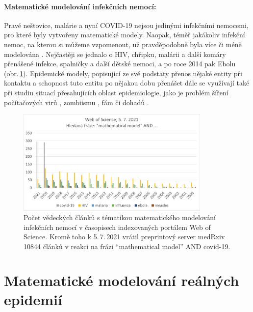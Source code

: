 
\paragraph{Matematické modelování infekčních nemocí:} Pravé neštovice, malárie a nyní COVID-19 nejsou jedinými infekčními nemocemi, pro které byly vytvořeny matematické modely. Naopak, téměř jakákoliv infekční nemoc, na kterou si můžeme vzpomenout, už pravděpodobně byla více či méně modelována \cite{AndersonMay1991,KeelingRohani2008,VynnyckyWhite2010,Ronn_etal2017,Finger_etal2019}. Nejčastěji se jednalo o HIV, chřipku, malárii a další komáry přenášené infekce, spalničky a další dětské nemoci, a po roce 2014 pak Ebolu (obr.\,\ref{wos}). Epidemické modely, popisující ze své podstaty přenos nějaké entity při kontaktu a schopnost tuto entitu po nějakou dobu přenášet dále se využívají také při studiu situací přesahujících oblast epidemiologie, jako je problém šíření počítačových virů \cite{YangYang2014}, zombiismu \cite{Alemi_etal2015}, fám či dohadů \cite{DaleyKendall1964}.

\begin{figure}[h]
\begin{center}
	\includegraphics[width=0.85\textwidth]{pic/wos_papers.png}
\end{center}
\caption{Počet vědeckých článků s tématikou matematického modelování infekčních nemocí v časopisech indexovaných portálem Web of Science. Kromě toho k 5.\,7.\,2021 vrátil preprintový server medRxiv 10844 článků v reakci na frázi ``mathematical model'' AND covid-19.}
\label{wos}
\end{figure}

\section*{Matematické modelování reálných epidemií}


